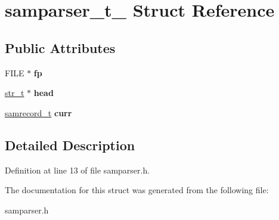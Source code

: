 \hypertarget{structsamparser__t__}{\section{samparser\-\_\-t\-\_\- Struct Reference}
\label{structsamparser__t__}
}
\subsection*{Public Attributes}
\begin{DoxyCompactItemize}
\item 
\hypertarget{structsamparser__t___afd1ab92a7ab7343c449da022e409403a}{F\-I\-L\-E $\ast$ {\bfseries fp}}\label{structsamparser__t___afd1ab92a7ab7343c449da022e409403a}

\item 
\hypertarget{structsamparser__t___a7b676fc46202d019893dffcfc2705c62}{\hyperlink{structstr__t__}{str\-\_\-t} $\ast$ {\bfseries head}}\label{structsamparser__t___a7b676fc46202d019893dffcfc2705c62}

\item 
\hypertarget{structsamparser__t___ab34095e9aaa9bc42f3c4d21801626cd2}{\hyperlink{structsamrecord__t__}{samrecord\-\_\-t} {\bfseries curr}}\label{structsamparser__t___ab34095e9aaa9bc42f3c4d21801626cd2}

\end{DoxyCompactItemize}


\subsection{Detailed Description}


Definition at line 13 of file samparser.\-h.



The documentation for this struct was generated from the following file\-:\begin{DoxyCompactItemize}
\item 
samparser.\-h\end{DoxyCompactItemize}
